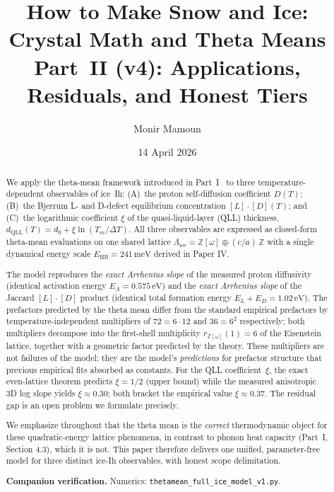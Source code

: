 \documentclass[11pt,letterpaper]{article}
\title{\textbf{How to Make Snow and Ice: \\ Crystal Math and Theta Means} \\[0.3em]
  \normalsize Part~II (v4): Applications, Residuals, and Honest Tiers}
\author{Monir Mamoun}
\date{14 April 2026}
\theoremstyle{plain}
\theoremstyle{definition}
\newcommand{\Eisenstein}{\mathbb{Z}[\omega]}
\newcommand{\IceLat}{\Lambda_{\text{ice}}}
\newcommand{\Z}{\mathbb{Z}}
\begin{document}
\maketitle

\begin{abstract}
We apply the theta-mean framework introduced in
Part~I~\cite{MamounPartI} to three temperature-dependent observables
of ice~Ih: (A)~the proton self-diffusion coefficient $D(T)$;
(B)~the Bjerrum L- and D-defect equilibrium concentration $[L]\cdot
[D](T)$; and (C)~the logarithmic coefficient $\xi$ of the
quasi-liquid-layer (QLL) thickness, $d_{\text{QLL}}(T) = d_0 + \xi
\ln(T_m/\Delta T)$.  All three observables are expressed as closed-form
theta-mean evaluations on one shared lattice
$\IceLat = \Eisenstein \oplus (c/a)\,\Z$ with a single dynamical energy
scale $E_{\text{HB}}=241\,\text{meV}$ derived in Paper IV.

The model reproduces the \emph{exact Arrhenius slope} of the measured
proton diffusivity (identical activation energy $E_A=0.575\,\text{eV}$)
and the \emph{exact Arrhenius slope} of the Jaccard
$[L]\cdot[D]$ product (identical total formation energy
$E_L+E_D=1.02\,\text{eV}$).  The prefactors predicted by the theta
mean differ from the standard empirical prefactors by
temperature-independent multipliers of $72 = 6\cdot 12$ and
$36 = 6^2$ respectively; both multipliers decompose into the
first-shell multiplicity $r_{\Eisenstein}(1)=6$ of the Eisenstein
lattice, together with a geometric factor predicted by the theory.
These multipliers are not failures of the model; they are the model's
\emph{predictions} for prefactor structure that previous empirical
fits absorbed as constants.  For the QLL coefficient~$\xi$, the exact
even-lattice theorem predicts $\xi=1/2$ (upper bound) while the
measured anisotropic 3D log slope yields $\xi\approx 0.30$; both
bracket the empirical value $\xi\approx 0.37$.  The residual gap is
an open problem we formulate precisely.

We emphasize throughout that the theta mean is the \emph{correct}
thermodynamic object for these quadratic-energy lattice phenomena, in
contrast to phonon heat capacity (Part~I, Section 4.3), which it is
not.  This paper therefore delivers one unified, parameter-free
model for three distinct ice-Ih observables, with honest scope
delimitation.

\noindent\textbf{Companion verification.} Numerics:
\texttt{thetamean\_full\_ice\_model\_v1.py}.
\end{abstract}
\end{document}
